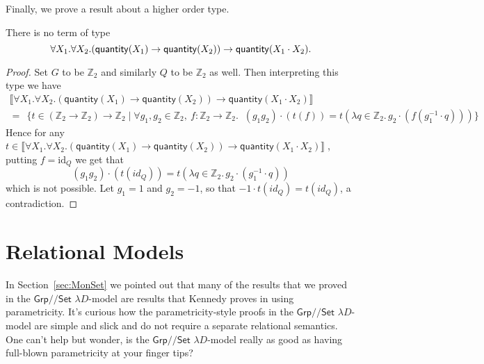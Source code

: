 \documentclass[a4paper,UKenglish]{lipics}
\newcommand\note[1]{{ \bf \textcolor{red} {\vspace{2mm}\; \\ Note: #1\\}}}
\newcommand{\msf}[1]{\mathsf{#1}} %
\newcommand{\Grp}{\msf{Grp}}
\newcommand{\Set}{\msf{Set}}
\newcommand{\Lslice}[1]{#1/\!/\Set}
\newcommand{\GrpSet}{\Lslice{\Grp}}
\newcommand{\bbZ}{\mathbb{Z}}
\newcommand{\sem}[1]{\ensuremath{\llbracket #1 \rrbracket} \;}
\newcommand{\qnt}{\msf{quantity}}
\newcommand{\id}{\mathrm{id}}
\begin{document}
Finally, we prove a result about a higher order type.

\begin{theorem}\label{thm:UninhabInt}
There is no term of type
\[\forall X_1. \forall X_2. (\qnt(X_1) \rightarrow \qnt(X_2)) \rightarrow \qnt(X_1 \cdot X_2)\text.\]
\end{theorem}
\begin{proof}
Set $G$ to be $\bbZ_2$ and similarly $Q$ to be $\bbZ_2$ as well. Then interpreting this type we have
 \begin{multline*}
\sem{\forall X_1. \forall X_2. (\qnt(X_1) \rightarrow \qnt(X_2)) \rightarrow \qnt(X_1 \cdot X_2)} \\=\ \  \{ t \in (\bbZ_2 \rightarrow \bbZ_2) \rightarrow \bbZ_2 \; | \; \forall g_1,  g_2 \in \bbZ_2,\ f:\bbZ_2\to \bbZ_2. \; \; (g_1 g_2) \cdot (t(f))=
t(\lambda q\in \bbZ_2.\,g_2\cdot (f(g_1^{-1}\cdot q))) \}
 \end{multline*}
Hence for any $t \in  \sem{\forall X_1. \forall X_2. (\qnt(X_1) \rightarrow \qnt(X_2)) \rightarrow \qnt(X_1 \cdot X_2)}$, putting
$f=\id_Q$ we get that
\[
(g_1 g_2) \cdot (t(id_Q)) = t(\lambda q\in \bbZ_2.\,g_2\cdot (g_1^{-1}\cdot q))
\]
which is not possible. Let $g_1 = 1$ and $g_2 = -1$,
so that $-1\cdot t(id_Q)=t(id_Q)$, a contradiction.
\end{proof}












\section{Relational Models}
\label{sec:param}
In Section~\ref{sec:MonSet} we pointed out that many of the results that we proved in the $\GrpSet$ $\lambda D$-model are results that  Kennedy proves in \cite{Kennedy:1997:RPU:263699.263761} using parametricity. It's curious how the parametricity-style proofs in the $\GrpSet$ $\lambda D$-model are simple and slick and do not require a separate relational semantics. One can't help but wonder, is the $\GrpSet$ $\lambda D$-model really as good as having full-blown parametricity at your finger tips?
\end{document}
